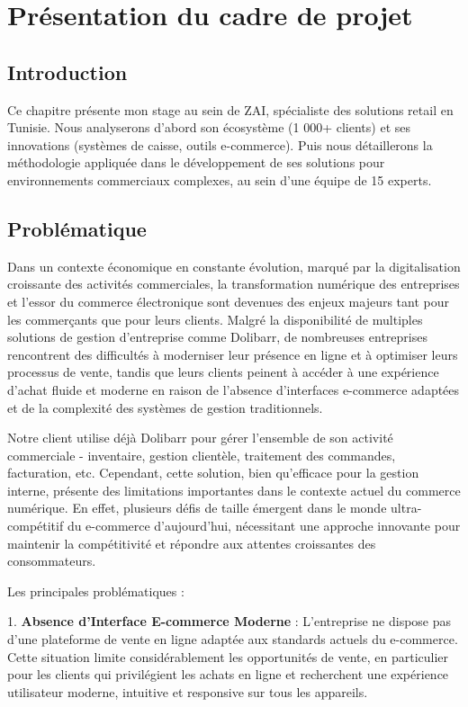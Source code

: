 \documentclass[12pt,a4paper]{report}
\begin{document}
\chapter{Présentation du cadre de projet}

\section{Introduction}
Ce chapitre présente mon stage au sein de ZAI, spécialiste des solutions retail en Tunisie. Nous analyserons d'abord son écosystème (1 000+ clients) et ses innovations (systèmes de caisse, outils e-commerce). Puis nous détaillerons la méthodologie appliquée dans le développement de ses solutions pour environnements commerciaux complexes, au sein d'une équipe de 15 experts.

\section{Problématique}
Dans un contexte économique en constante évolution, marqué par la digitalisation croissante des activités commerciales, la transformation numérique des entreprises et l'essor du commerce électronique sont devenues des enjeux majeurs tant pour les commerçants que pour leurs clients. Malgré la disponibilité de multiples solutions de gestion d'entreprise comme Dolibarr, de nombreuses entreprises rencontrent des difficultés à moderniser leur présence en ligne et à optimiser leurs processus de vente, tandis que leurs clients peinent à accéder à une expérience d'achat fluide et moderne en raison de l'absence d'interfaces e-commerce adaptées et de la complexité des systèmes de gestion traditionnels.

Notre client utilise déjà Dolibarr pour gérer l'ensemble de son activité commerciale - inventaire, gestion clientèle, traitement des commandes, facturation, etc. Cependant, cette solution, bien qu'efficace pour la gestion interne, présente des limitations importantes dans le contexte actuel du commerce numérique. En effet, plusieurs défis de taille émergent dans le monde ultra-compétitif du e-commerce d'aujourd'hui, nécessitant une approche innovante pour maintenir la compétitivité et répondre aux attentes croissantes des consommateurs.

Les principales problématiques :

1. \textbf{Absence d'Interface E-commerce Moderne} : L'entreprise ne dispose pas d'une plateforme de vente en ligne adaptée aux standards actuels du e-commerce. Cette situation limite considérablement les opportunités de vente, en particulier pour les clients qui privilégient les achats en ligne et recherchent une expérience utilisateur moderne, intuitive et responsive sur tous les appareils.
\end{document}
